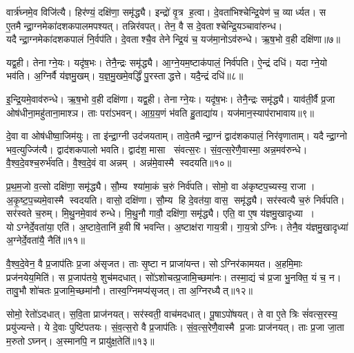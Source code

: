 वार्त्र॑घ्नमे॒व विजि॑त्यै।
हिर॑ण्यं॒ दक्षि॑णा॒ समृ॑द्ध्यै।
इन्द्रो॑ वृ॒त्र ह॒त्वा।
दे॒वता॑भिश्चेन्द्रि॒येण॑ च॒ व्यार्ध्यत।
स ए॒तमैन्द्रा॒ग्नमेका॑दशकपालमपश्यत्।
तन्निर॑वपत्।
तेन॒ वै स दे॒वताश्चेन्द्रि॒यञ्चावा॑रुन्ध।
यदैन्द्रा॒ग्नमेका॑दशकपालं नि॒र्वप॑ति।
दे॒वताश्चै॒व तेनेन्द्रि॒यं च॒ यज॑मा॒नोऽव॑रुन्धे।
ऋ॒ष॒भो व॒ही दक्षि॑णा॥७॥

यद्व॒ही।
तेनाग्ने॒यः।
यदृ॑ष॒भः।
तेनै॒न्द्रः समृ॑द्ध्यै।
आ॒ग्ने॒यम॒ष्टाक॑पालं॒ निर्व॑पति।
ऐ॒न्द्रं दधि॑।
यदाग्ने॒यो भव॑ति।
अ॒ग्निर्वै य॑ज्ञमु॒खम्।
य॒ज्ञ॒मु॒खमे॒वर्द्धिं॑ पु॒रस्ताद्धत्ते।
यदै॒न्द्रं दधि॑॥८॥

इ॒न्द्रि॒यमे॒वाव॑रुन्धे।
ऋ॒ष॒भो व॒ही दक्षि॑णा।
यद्व॒ही।
तेनाग्ने॒यः।
यदृ॑ष॒भः।
तेनै॒न्द्रः समृ॑द्ध्यै।
याव॑ती॒र्वै प्र॒जा ओष॑धीना॒महु॑ताना॒माश्ञ\sn{}।
ताः परा॑ऽभवन्।
आ॒ग्र॒य॒णं भ॑वति हु॒ताद्या॑य।
यज॑मान॒स्याप॑राभावाय॥९॥

दे॒वा वा ओष॑धीष्वा॒जिम॑युः।
ता इ॑न्द्रा॒ग्नी उद॑जयताम्।
तावे॒तमैन्द्रा॒ग्नं द्वाद॑शकपालं॒ निर॑वृणाताम्।
यदैन्द्रा॒ग्नो भव॒त्युज्जि॑त्यै।
द्वाद॑शकपालो भवति।
द्वाद॑श॒ मासा संवत्स॒रः।
सं॒व॒त्स॒रेणै॒वास्मा॒ अन्न॒मव॑रुन्धे।
वै॒श्व॒दे॒वश्च॒रुर्भ॑वति।
वै॒श्व॒दे॒वं वा अन्नम्।
अन्न॑मे॒वास्मै स्वदयति॥१०॥

प्र॒थ॒म॒जो व॒त्सो दक्षि॑णा॒ समृ॑द्ध्यै।
सौ॒म्य श्या॑मा॒कं च॒रुं निर्व॑पति।
सोमो॒ वा अ॑कृष्टप॒च्यस्य॒ राजा।
अ॒कृ॒ष्ट॒प॒च्यमे॒वास्मै स्वदयति।
वासो॒ दक्षि॑णा।
सौ॒म्य हि दे॒वत॑या॒ वास॒ समृ॑द्ध्यै।
सर॑स्वत्यै च॒रुं निर्व॑पति।
सर॑स्वते च॒रुम्।
मि॒थु॒नमे॒वाव॑ रुन्धे।
मि॒थु॒नौ गावौ॒ दक्षि॑णा॒ समृ॑द्ध्यै।
एति॒ वा ए॒ष य॑ज्ञमु॒खादृध्या।
योऽग्नेर्दे॒वता॑या॒ एति॑।
अ॒ष्टावे॒तानि॑ ह॒वीषि॑ भवन्ति।
अ॒ष्टाक्ष॑रा गाय॒त्री।
गा॒य॒त्रोऽग्निः।
तेनै॒व य॑ज्ञमु॒खादृध्या॑ अ॒ग्नेर्दे॒वता॑यै॒ नैति॑॥११॥

वै॒श्व॒दे॒वेन॒ वै प्र॒जाप॑तिः प्र॒जा अ॑सृजत।
ताः सृ॒ष्टा न प्राजा॑यन्त।
सोऽग्निर॑कामयत।
अ॒हमि॒माः प्रज॑नयेय॒मिति॑।
स प्र॒जाप॑तये॒ शुच॑मदधात्।
सो॑ऽशोचत्प्र॒जामि॒च्छमा॑नः।
तस्मा॒द्यं च॑ प्र॒जा भु॒नक्ति॒ यं च॒ न।
तावु॒भौ शो॑चतः प्र॒जामि॒च्छमा॑नौ।
तास्व॒ग्निमप्य॑सृजत्।
ता अ॒ग्निरध्यैत्॥१२॥

सोमो॒ रेतो॑ऽदधात्।
स॒वि॒ता प्राज॑नयत्।
सर॑स्वती॒ वाच॑मदधात्।
पू॒षाऽपो॑षयत्।
ते वा ए॒ते त्रिः सं॑वत्स॒रस्य॒ प्रयु॑ज्यन्ते।
ये दे॒वाः पुष्टि॑पतयः।
सं॒व॒त्स॒रो वै प्र॒जाप॑तिः।
सं॒व॒त्स॒रेणै॒वास्मै प्र॒जाः प्राज॑नयत्।
ताः प्र॒जा जा॒ता म॒रुतोऽघ्नन्।
अ॒स्मानपि॒ न प्रायु॑क्ष॒तेति॑॥१३॥

